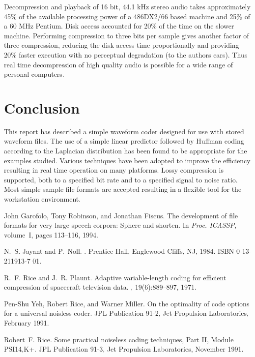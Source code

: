 Decompression and playback of 16 bit, 44.1 kHz stereo audio takes
approximately 45\% of the available processing power of a 486DX2/66
based machine and 25\% of a 60 MHz Pentium.  Disk access accounted for
20\% of the time on the slower machine.  Performing compression to three
bits per sample gives another factor of three compression, reducing the
disk access time proportionally and providing 20\% faster execution with
no perceptual degradation (to the authors ears).  Thus real time
decompression of high quality audio is possible for a wide range of
personal computers.

\section{Conclusion}

This report has described a simple waveform coder designed for use with
stored waveform files.  The use of a simple linear predictor followed by
Huffman coding according to the Laplacian distribution has been found to
be appropriate for the examples studied.  Various techniques have been
adopted to improve the efficiency resulting in real time operation on
many platforms.  Lossy compression is supported, both to a specified bit
rate and to a specified signal to noise ratio.  Most simple sample file
formats are accepted resulting in a flexible tool for the workstation
environment.

\begin{thebibliography}{1}

John Garofolo, Tony Robinson, and Jonathan Fiscus.
\newblock The development of file formats for very large speech corpora: Sphere
  and shorten.
\newblock In {\em Proc. ICASSP}, volume~I, pages 113--116, 1994.

N.~S. Jayant and P.~Noll.
.
\newblock Prentice Hall, Englewood Cliffs, NJ, 1984.
\newblock ISBN 0-13-211913-7 01.

R.~F. Rice and J.~R. Plaunt.
\newblock Adaptive variable-length coding for efficient compression of
  spacecraft television data.
, 19(6):889--897,
  1971.

Pen-Shu Yeh, Robert Rice, and Warner Miller.
\newblock On the optimality of code options for a universal noisless coder.
\newblock JPL Publication 91-2, Jet Propulsion Laboratories, February 1991.

Robert~F. Rice.
\newblock Some practical noiseless coding techniques, {Part II, Module
  PSI14,K+}.
\newblock JPL Publication 91-3, Jet Propulsion Laboratories, November 1991.

\end{thebibliography}

